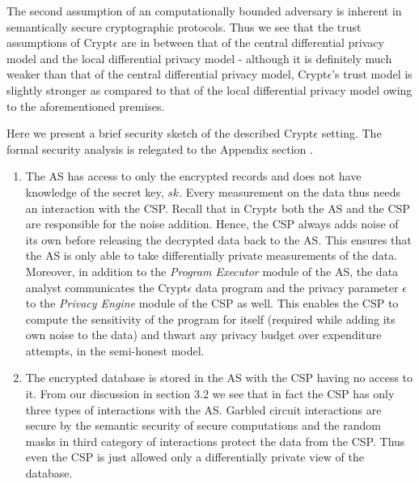 The second assumption of an computationally bounded adversary is inherent in semantically secure cryptographic protocols. Thus we see that the trust assumptions of Crypt$\epsilon$ are in between that of the central differential privacy model and the local differential privacy model - although it is definitely much weaker than that of the central differential privacy model, Crypt$\epsilon$'s trust model is slightly stronger as compared to that of the local differential privacy model owing to the aforementioned premises. \par Here we present a brief security sketch of the described Crypt$\epsilon$ setting. The formal security analysis is relegated to the Appendix section .  \begin{enumerate}\item The \textsf{AS} has access to only the encrypted records and does not have knowledge of the secret key, $sk$. Every measurement on the data thus needs an interaction with the \textsf{CSP}. Recall that in Crypt$\epsilon$ both the \textsf{AS} and the \textsf{CSP} are responsible for the noise addition.  Hence, the \textsf{CSP} always adds noise of its own before releasing the decrypted
data back to the \textsf{AS}. This ensures that the \textsf{AS} is only able to take differentially private measurements of the data.  Moreover, in addition to the \textit{Program Executor} module of the \textsf{AS}, the data analyst communicates the Crypt$\epsilon$ data program and the privacy parameter $\epsilon$ to the \textit{Privacy Engine} module of the \textsf{CSP} as well. This enables the \textsf{CSP} to compute the sensitivity  of the program for itself (required while adding its own noise to the data) and thwart any privacy budget over expenditure attempts, in the semi-honest model. 
\item The encrypted database is stored in the \textsf{AS} with the \textsf{CSP} having no access to it. From our discussion in section 3.2 we see that in fact the \textsf{CSP} has only three types of interactions with the \textsf{AS}. Garbled circuit interactions are secure by the semantic security of secure computations and the random masks in  third category of interactions protect the data from the \textsf{CSP}. Thus even the \textsf{CSP} is just allowed only a differentially private view of the database. \end{enumerate}
